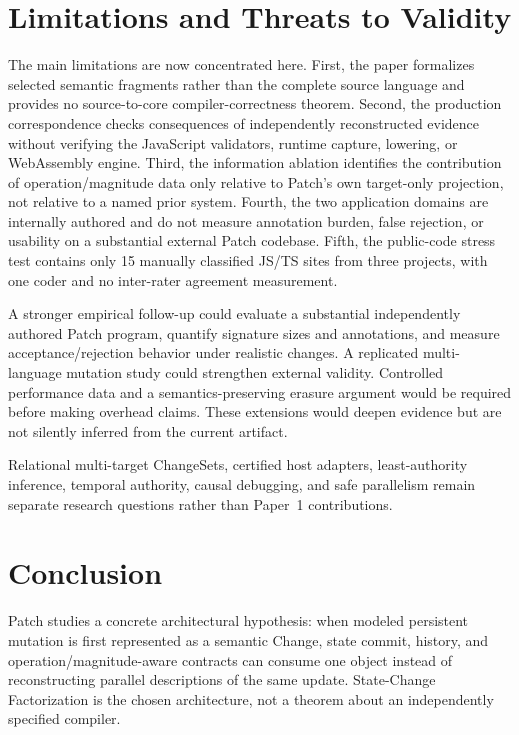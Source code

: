 \documentclass[10pt]{article}
\theoremstyle{plain}
\theoremstyle{remark}
\begin{document}


\section{Limitations and Threats to Validity}
\label{sec:limitations}
The main limitations are now concentrated here. First, the paper formalizes selected semantic fragments rather than the complete source language and provides no source-to-core compiler-correctness theorem. Second, the production correspondence checks consequences of independently reconstructed evidence without verifying the JavaScript validators, runtime capture, lowering, or WebAssembly engine. Third, the information ablation identifies the contribution of operation/magnitude data only relative to Patch's own target-only projection, not relative to a named prior system. Fourth, the two application domains are internally authored and do not measure annotation burden, false rejection, or usability on a substantial external Patch codebase. Fifth, the public-code stress test contains only 15 manually classified JS/TS sites from three projects, with one coder and no inter-rater agreement measurement.

A stronger empirical follow-up could evaluate a substantial independently authored Patch program, quantify signature sizes and annotations, and measure acceptance/rejection behavior under realistic changes. A replicated multi-language mutation study could strengthen external validity. Controlled performance data and a semantics-preserving erasure argument would be required before making overhead claims. These extensions would deepen evidence but are not silently inferred from the current artifact.

Relational multi-target ChangeSets, certified host adapters, least-authority inference, temporal authority, causal debugging, and safe parallelism remain separate research questions rather than Paper~1 contributions.

\section{Conclusion}
Patch studies a concrete architectural hypothesis: when modeled persistent mutation is first represented as a semantic Change, state commit, history, and operation/magnitude-aware contracts can consume one object instead of reconstructing parallel descriptions of the same update. State-Change Factorization is the chosen architecture, not a theorem about an independently specified compiler.
\end{document}
